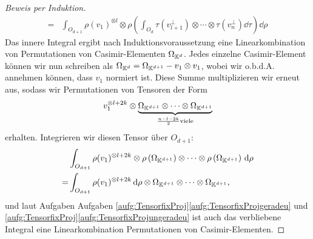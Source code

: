 \begin{proof}[Beweis per Induktion]
\begin{align*}
	= &\int_{O_{d+1}} \rho(v_1)^{\otimes l}\otimes \rho\left(\int_{O_{d}}\tau(v_{l+1}^\perp) \otimes \cdots \otimes \tau(v_n^\perp) \dd \tau \right) \dd \rho
\end{align*}
Das innere Integral ergibt nach Induktionsvoraussetzung eine Linearkombination von Permutationen von Casimir-Elementen $\Omega_{\mathbb{K}^d}$. Jedes einzelne Casimir-Element können wir nun schreiben als $\Omega_{\mathbb{K}^d} = \Omega_{\mathbb{K}^{d+1}} - v_1 \otimes v_1$, wobei wir o.b.d.A. annehmen können, dass $v_1$ normiert ist. Diese Summe multiplizieren wir erneut aus, sodass wir Permutationen von Tensoren der Form
\begin{align*}
	v_1^{\otimes l+2k} \otimes \underbrace{\Omega_{\mathbb{K}^{d+1}} \otimes \cdots \otimes \Omega_{\mathbb{K}^{d+1}}}_{\frac{n-l-2k}{2} \text{viele}}
\end{align*}
erhalten. Integrieren wir diesen Tensor über $O_{d+1}$: 
\begin{align*}
	&\int_{O_{d+1}} \rho(v_1)^{\otimes l+2k} \otimes \rho\left(\Omega_{\mathbb{K}^{d+1}}\right) \otimes \cdots \otimes \rho\left(\Omega_{\mathbb{K}^{d+1}}\right)\,\textrm{d} \rho \\
	=& \int_{O_{d+1}} \rho(v_1)^{\otimes l+2k} \,\textrm{d} \rho \otimes \Omega_{\mathbb{K}^{d+1}} \otimes \cdots \otimes \Omega_{\mathbb{K}^{d+1}},
\end{align*}
und laut Aufgaben Aufgaben \ref{aufg:TensorfixProj}\ref{aufg:TensorfixProjgeradeu} und \ref{aufg:TensorfixProj}\ref{aufg:TensorfixProjungeradeu} ist auch das verbliebene Integral eine Linearkombination Permutationen von Casimir-Elementen.
\end{proof}

